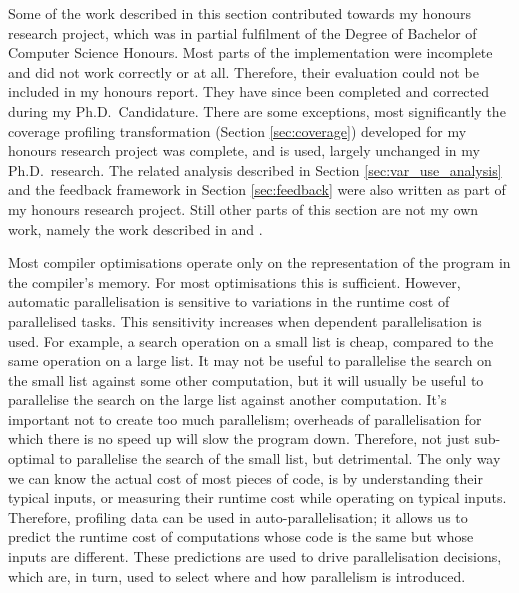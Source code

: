 

Some of the work described in this section contributed towards my honours research project,
which was in partial fulfilment of the Degree of Bachelor of Computer Science
Honours.
Most parts of the implementation were incomplete and did not work correctly or
at all.
Therefore,
their evaluation could not be included in my honours report.
They have since been completed and corrected during my Ph.D.\ Candidature.
There are some exceptions,
most significantly the coverage profiling transformation (Section \ref{sec:coverage})
developed for my honours research project was complete, and is used, largely
unchanged in my Ph.D.\ research.
The related analysis described in Section \ref{sec:var_use_analysis}
and the feedback framework in Section \ref{sec:feedback}
were also written as part of my honours research project.
Still other parts of this section are not my own work,
namely the work described in
\citet{conway:2001:mercury-deep} and
\citet{tannier:2007:parallel_mercury}.

Most compiler optimisations operate only on the representation of the program
in the compiler's memory.
For most optimisations this is sufficient.
However,
automatic parallelisation is sensitive to variations in the runtime cost of
parallelised tasks.
This sensitivity increases when dependent parallelisation is used.
For example,
a search operation on a small list is cheap, compared to the same operation on
a large list.
It may not be useful to parallelise the search on the small list against some
other computation,
but it will usually be useful to parallelise the search on the large list
against another computation.
It's important not to create too much parallelism;
overheads of parallelisation for which there is no speed up will slow the
program down.
Therefore, not just sub-optimal to parallelise the search of the small list,
but detrimental.
The only way we can know the actual cost of most pieces of code,
is by understanding their typical inputs,
or measuring their runtime cost while operating on typical inputs.
Therefore,
profiling data can be used in auto-parallelisation;
it allows us to predict the runtime cost of computations whose
code is the same but whose inputs are different.
These predictions are used to drive parallelisation decisions,
which are, in turn, used to select where and how parallelism is introduced.

